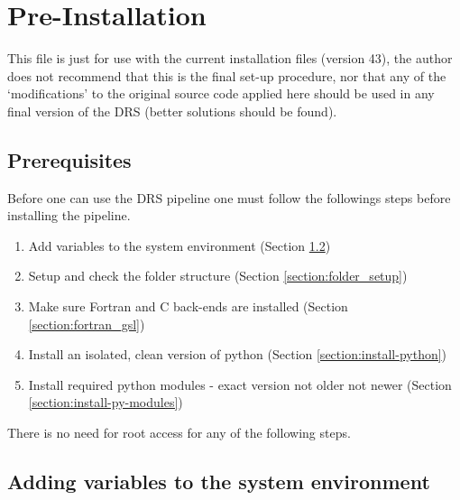 \chapter{Pre-Installation}

This file is just for use with the current installation files (version 43), the author does not recommend that this is the final set-up procedure, nor that any of the `modifications' to the original source code applied here should be used in any final version of the DRS (better solutions should be found). \\



\section{Prerequisites}

Before one can use the DRS pipeline one must follow the followings steps before installing the pipeline.

\begin{enumerate}
\item Add variables to the system environment (Section \ref{section:edit_env_setup})
\item Setup and check the folder structure (Section \ref{section:folder_setup})
\item Make sure Fortran and C back-ends are installed (Section \ref{section:fortran_gsl})
\item Install an isolated, clean version of python (Section \ref{section:install-python})
\item Install required python modules - exact version not older not newer (Section \ref{section:install-py-modules})
\end{enumerate}

\noindent There is no need for root access for any of the following steps.

\section{Adding variables to the system environment}
\label{section:edit_env_setup}

